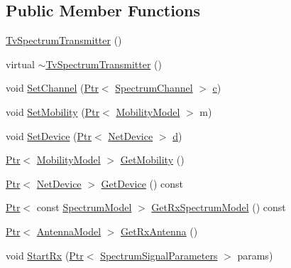 \subsection*{Public Member Functions}
\begin{DoxyCompactItemize}
\item 
\hyperlink{classns3_1_1TvSpectrumTransmitter_afcc26ad106aff1fb09e1c2d4ac214117}{Tv\+Spectrum\+Transmitter} ()
\item 
virtual \hyperlink{classns3_1_1TvSpectrumTransmitter_a053e897e16a86d44c7892c533e9295cb}{$\sim$\+Tv\+Spectrum\+Transmitter} ()
\item 
void \hyperlink{classns3_1_1TvSpectrumTransmitter_a3db73492384cd7d823494b1bbc4b1b71}{Set\+Channel} (\hyperlink{classns3_1_1Ptr}{Ptr}$<$ \hyperlink{classns3_1_1SpectrumChannel}{Spectrum\+Channel} $>$ \hyperlink{mmwave_2model_2fading-traces_2fading__trace__generator_8m_ae0323a9039add2978bf5b49550572c7c}{c})
\item 
void \hyperlink{classns3_1_1TvSpectrumTransmitter_a1ee9da5da9b2f6fa1d5f4674d0b5f53e}{Set\+Mobility} (\hyperlink{classns3_1_1Ptr}{Ptr}$<$ \hyperlink{classns3_1_1MobilityModel}{Mobility\+Model} $>$ m)
\item 
void \hyperlink{classns3_1_1TvSpectrumTransmitter_a8d5496690882b86cb9e905100f692b39}{Set\+Device} (\hyperlink{classns3_1_1Ptr}{Ptr}$<$ \hyperlink{classns3_1_1NetDevice}{Net\+Device} $>$ \hyperlink{lte__pathloss_8m_a1aabac6d068eef6a7bad3fdf50a05cc8}{d})
\item 
\hyperlink{classns3_1_1Ptr}{Ptr}$<$ \hyperlink{classns3_1_1MobilityModel}{Mobility\+Model} $>$ \hyperlink{classns3_1_1TvSpectrumTransmitter_a82b56b6da36d2d82e366f9b304d7d307}{Get\+Mobility} ()
\item 
\hyperlink{classns3_1_1Ptr}{Ptr}$<$ \hyperlink{classns3_1_1NetDevice}{Net\+Device} $>$ \hyperlink{classns3_1_1TvSpectrumTransmitter_a542ce8493f8808e9f137f3963c21ed66}{Get\+Device} () const 
\item 
\hyperlink{classns3_1_1Ptr}{Ptr}$<$ const \hyperlink{classns3_1_1SpectrumModel}{Spectrum\+Model} $>$ \hyperlink{classns3_1_1TvSpectrumTransmitter_acd5f9fd454de31839818ca0fdf61693c}{Get\+Rx\+Spectrum\+Model} () const 
\item 
\hyperlink{classns3_1_1Ptr}{Ptr}$<$ \hyperlink{classns3_1_1AntennaModel}{Antenna\+Model} $>$ \hyperlink{classns3_1_1TvSpectrumTransmitter_a50ace28d52f74a867343446689e20d0b}{Get\+Rx\+Antenna} ()
\item 
void \hyperlink{classns3_1_1TvSpectrumTransmitter_ae913f36cda537d9f0834c7ed0d974745}{Start\+Rx} (\hyperlink{classns3_1_1Ptr}{Ptr}$<$ \hyperlink{structns3_1_1SpectrumSignalParameters}{Spectrum\+Signal\+Parameters} $>$ params)

\end{DoxyCompactItemize}

